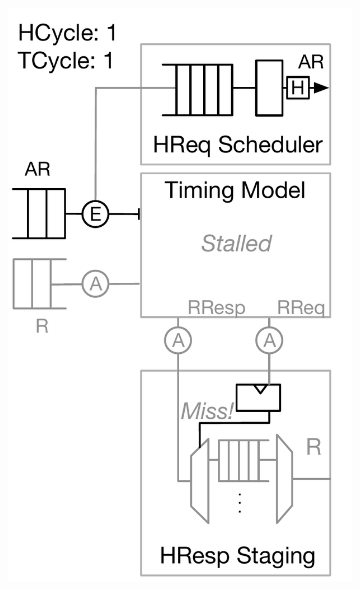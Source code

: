 \begin{figure}[t]
\begin{subfigure}[t]{0.23\textwidth}
        \caption{}
        \label{fig:model-operation-1}
    \end{subfigure}
    \begin{subfigure}[t]{0.24\textwidth}
        \includegraphics[width=\columnwidth]{figures/model-operation-2.pdf}
        \caption{}
        \label{fig:model-operation-2}
    \end{subfigure}
    \begin{subfigure}[t]{0.24\textwidth}

\end{subfigure}
\end{figure}

